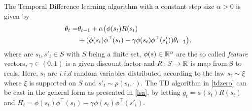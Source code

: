\begin{example}
The Temporal Difference learning algorithm with a constant step size $\alpha>0$ is given by
\begin{align}\label{tdzero}
\theta_t=&\theta_{t-1}+\alpha \big(\phi(s_t) R(s_t)\nonumber\\&+ (\phi(s_t)\phi^\top(s_t)-\gamma \phi(s_t)\phi^\top(s'_t))\theta_{t-1}\big),
\end{align}
where are $s_t,s'_t\in S$ with $S$ being a finite set, $\phi(s)\in \mathbb{R}^n$ are the so called \emph{feature} vectors, $\gamma\in (0,1)$ is a given discount factor and $R\colon S\rightarrow \mathbb{R}$ is map from S to reals. Here, $s_t$ are $i.i.d$ random variables distributed according to the law $s_t\sim \xi$ where $\xi$ is supported on $S$ and $s'_t\sim p(s_t,\cdot)$. The TD algorithm in \eqref{tdzero} can be cast in the general form as presented in \eqref{lsa}, by letting $g_t=\phi(s_t)R(s_t)$ and $H_t=\phi(s_t)\phi^\top(s_t)-\gamma \phi(s_t)\phi^\top(s'_t)$.
\end{example}


